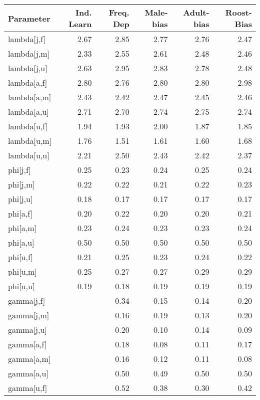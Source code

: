\begin{table}[ht]
\centering
\begingroup\scriptsize
\begin{tabular}{lrrrrr}
  \hline
Parameter & Ind. Learn & Freq. Dep & Male-bias & Adult-bias & Roost-Bias \\ 
  \hline
lambda[j,f] & 2.67 & 2.85 & 2.77 & 2.76 & 2.47 \\ 
  lambda[j,m] & 2.33 & 2.55 & 2.61 & 2.48 & 2.46 \\ 
  lambda[j,u] & 2.63 & 2.95 & 2.83 & 2.78 & 2.48 \\ 
  lambda[a,f] & 2.80 & 2.76 & 2.80 & 2.80 & 2.98 \\ 
  lambda[a,m] & 2.43 & 2.42 & 2.47 & 2.45 & 2.46 \\ 
  lambda[a,u] & 2.71 & 2.70 & 2.74 & 2.75 & 2.74 \\ 
  lambda[u,f] & 1.94 & 1.93 & 2.00 & 1.87 & 1.85 \\ 
  lambda[u,m] & 1.76 & 1.51 & 1.61 & 1.60 & 1.68 \\ 
  lambda[u,u] & 2.21 & 2.50 & 2.43 & 2.42 & 2.37 \\ 
  phi[j,f] & 0.25 & 0.23 & 0.24 & 0.25 & 0.24 \\ 
  phi[j,m] & 0.22 & 0.22 & 0.21 & 0.22 & 0.23 \\ 
  phi[j,u] & 0.18 & 0.17 & 0.17 & 0.17 & 0.17 \\ 
  phi[a,f] & 0.20 & 0.22 & 0.20 & 0.20 & 0.21 \\ 
  phi[a,m] & 0.23 & 0.24 & 0.23 & 0.23 & 0.24 \\ 
  phi[a,u] & 0.50 & 0.50 & 0.50 & 0.50 & 0.50 \\ 
  phi[u,f] & 0.21 & 0.25 & 0.23 & 0.24 & 0.22 \\ 
  phi[u,m] & 0.25 & 0.27 & 0.27 & 0.29 & 0.29 \\ 
  phi[u,u] & 0.19 & 0.18 & 0.19 & 0.19 & 0.19 \\ 
  gamma[j,f] &  & 0.34 & 0.15 & 0.14 & 0.20 \\ 
  gamma[j,m] &  & 0.16 & 0.19 & 0.13 & 0.20 \\ 
  gamma[j,u] &  & 0.20 & 0.10 & 0.14 & 0.09 \\ 
  gamma[a,f] &  & 0.18 & 0.08 & 0.11 & 0.17 \\ 
  gamma[a,m] &  & 0.16 & 0.12 & 0.11 & 0.08 \\ 
  gamma[a,u] &  & 0.50 & 0.49 & 0.50 & 0.50 \\ 
  gamma[u,f] &  & 0.52 & 0.38 & 0.30 & 0.42 \\ 

\end{tabular}
\end{table}
